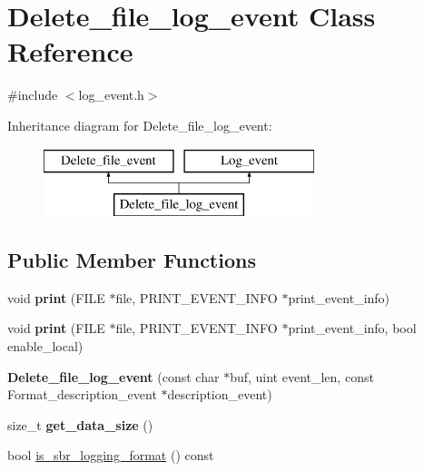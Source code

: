 \hypertarget{classDelete__file__log__event}{}\section{Delete\+\_\+file\+\_\+log\+\_\+event Class Reference}
\label{classDelete__file__log__event}


{\ttfamily \#include $<$log\+\_\+event.\+h$>$}

Inheritance diagram for Delete\+\_\+file\+\_\+log\+\_\+event\+:\begin{figure}[H]
\begin{center}
\leavevmode
\includegraphics[height=2.000000cm]{classDelete__file__log__event}
\end{center}
\end{figure}
\subsection*{Public Member Functions}
\begin{DoxyCompactItemize}
\item 
\mbox{\label{classDelete__file__log__event_afb834bc591b8ea429bfaafa6f7c47367}} 
void {\bfseries print} (F\+I\+LE $\ast$file, P\+R\+I\+N\+T\+\_\+\+E\+V\+E\+N\+T\+\_\+\+I\+N\+FO $\ast$print\+\_\+event\+\_\+info)
\item 
\mbox{\label{classDelete__file__log__event_ab0b50becd5bf5c1114732e31af3892f1}} 
void {\bfseries print} (F\+I\+LE $\ast$file, P\+R\+I\+N\+T\+\_\+\+E\+V\+E\+N\+T\+\_\+\+I\+N\+FO $\ast$print\+\_\+event\+\_\+info, bool enable\+\_\+local)
\item 
\mbox{\label{classDelete__file__log__event_a99a8f0f207a36c4d88fba48c7627f468}} 
{\bfseries Delete\+\_\+file\+\_\+log\+\_\+event} (const char $\ast$buf, uint event\+\_\+len, const Format\+\_\+description\+\_\+event $\ast$description\+\_\+event)
\item 
\mbox{\label{classDelete__file__log__event_adc92cf6c4ed780c470ac7a4a5c68ad84}} 
size\+\_\+t {\bfseries get\+\_\+data\+\_\+size} ()
\item 
bool \mbox{\hyperlink{classDelete__file__log__event_a3cba2bd9057ac18a7ac720bbfeb2081f}{is\+\_\+sbr\+\_\+logging\+\_\+format}} () const
\end{DoxyCompactItemize}
